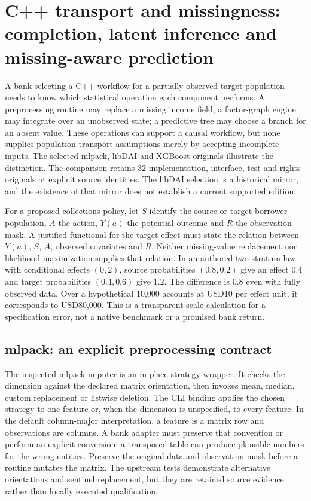 \section[C++ transport and missingness contracts]{C++ transport and missingness: completion, latent inference and missing-aware prediction}
\label{sec:exec25-ctm}

A bank selecting a C++ workflow for a partially observed target population needs to know which statistical operation each component performs. A preprocessing routine may replace a missing income field; a factor-graph engine may integrate over an unobserved state; a predictive tree may choose a branch for an absent value. These operations can support a causal workflow, but none supplies population transport assumptions merely by accepting incomplete inputs. The selected mlpack, libDAI and XGBoost originals illustrate the distinction. The comparison retains 32 implementation, interface, test and rights originals at explicit source identities. The libDAI selection is a historical mirror, and the existence of that mirror does not establish a current supported edition.\citep{exec25_ctm_mlpack,exec25_ctm_libdai,exec25_ctm_xgboost}

For a proposed collections policy, let $S$ identify the source or target borrower population, $A$ the action, $Y(a)$ the potential outcome and $R$ the observation mask. A justified functional for the target effect must state the relation between $Y(a)$, $S$, $A$, observed covariates and $R$. Neither missing-value replacement nor likelihood maximization supplies that relation. In an authored two-stratum law with conditional effects $(0,2)$, source probabilities $(0.8,0.2)$ give an effect $0.4$ and target probabilities $(0.4,0.6)$ give $1.2$. The difference is $0.8$ even with fully observed data. Over a hypothetical 10,000 accounts at USD10 per effect unit, it corresponds to USD80,000. This is a transparent scale calculation for a specification error, not a native benchmark or a promised bank return.\citep{exec25_ctm_choice}

\subsection*{mlpack: an explicit preprocessing contract}
The inspected mlpack imputer is an in-place strategy wrapper. It checks the dimension against the declared matrix orientation, then invokes mean, median, custom replacement or listwise deletion. The CLI binding applies the chosen strategy to one feature or, when the dimension is unspecified, to every feature. In the default column-major interpretation, a feature is a matrix row and observations are columns. A bank adapter must preserve that convention or perform an explicit conversion; a transposed table can produce plausible numbers for the wrong entities. Preserve the original data and observation mask before a routine mutates the matrix. The upstream tests demonstrate alternative orientations and sentinel replacement, but they are retained source evidence rather than locally executed qualification.\citep{exec25_ctm_mlpack}

